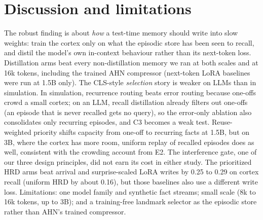 \documentclass[letterpaper,10pt,twocolumn]{article}
\begin{document}
\section{Discussion and limitations}
The robust finding is about \emph{how} a test-time memory should write into slow weights: train the cortex only on what the episodic store has been seen to recall, and distil the model's own in-context behaviour rather than its next-token loss. Distillation arms beat every non-distillation memory we ran at both scales and at 16k tokens, including the trained AHN compressor (next-token LoRA baselines were run at 1.5B only). The CLS-style \emph{selection} story is weaker on LLMs than in simulation. In simulation, recurrence routing beats error routing because one-offs crowd a small cortex; on an LLM, recall distillation already filters out one-offs (an episode that is never recalled gets no query), so the error-only ablation also consolidates only recurring episodes, and C3 becomes a weak test. Reuse-weighted priority shifts capacity from one-off to recurring facts at 1.5B, but on 3B, where the cortex has more room, uniform replay of recalled episodes does as well, consistent with the crowding account from E2. The interference gate, one of our three design principles, did not earn its cost in either study. The prioritized HRD arms beat arrival and surprise-scaled LoRA writes by 0.25 to 0.29 on cortex recall (uniform HRD by about 0.16), but those baselines also use a different write loss. Limitations: one model family and synthetic fact streams; small scale (8k to 16k tokens, up to 3B); and a training-free landmark selector as the episodic store rather than AHN's trained compressor.
\end{document}
